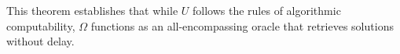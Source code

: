\documentclass[12pt]{article}
\begin{document}
This theorem establishes that while \( U \) follows the rules of algorithmic computability, \( \Omega \) functions as an all-encompassing oracle that retrieves solutions without delay.





\end{document}
